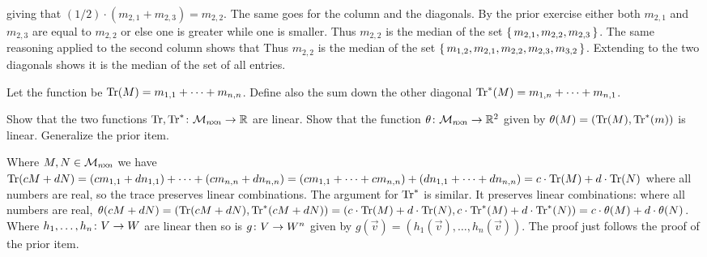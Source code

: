 \begin{exercises}
\begin{answer}
\begin{exparts}
          giving that $(1/2)\cdot(m_{2,1}+m_{2,3})=m_{2,2}$.
          The same goes for the column and the diagonals.
        \partsitem
          By the prior exercise either both $m_{2,1}$ and $m_{2,3}$ are equal
          to $m_{2,2}$ or else one is greater while one is smaller.
          Thus $m_{2,2}$ is the median of the set
          $\mbox{$\{\,m_{2,1},m_{2,2},m_{2,3}\,\}$}$.
          The same reasoning applied to the second column shows that 
          Thus $m_{2,2}$ is the median of the set
          $\mbox{$\{\,m_{1,2},m_{2,1},m_{2,2},m_{2,3},m_{3,2}\,\}$}$.
          Extending to the two diagonals shows it is the median of the set
          of all entries.
      \end{exparts}
    \end{answer}
  \item   \label{exer:TraceIsLinear}
    Let the  function be 
    $\operatorname{Tr} (M)=m_{1,1}+\cdots+m_{n,n}$.
    Define also
    the sum down the other diagonal
    $\operatorname{Tr}^* (M)=m_{1,n}+\cdots+m_{n,1}$.
    \begin{exparts}
      \partsitem 
        Show that the two functions 
        $\mbox{$\operatorname{Tr},\operatorname{Tr}^*\colon \mathcal{M}_{n \! \times \! n}\to \mathbb{R}$}$
        are linear.
      \partsitem
        Show that the function
       $\mbox{$\theta\colon \mathcal{M}_{n \! \times \! n}\to \mathbb{R}^2$}$
       given by $\theta(M)=(\operatorname{Tr}(M),\operatorname{Tr}^*(m))$
       is linear.
     \partsitem
       Generalize the prior item. 
    \end{exparts}
    \begin{answer}
      \begin{exparts}
        \partsitem
          Where $M,N\in\mathcal{M}_{n \! \times \! n}$ we have 
          $\operatorname{Tr}(cM+dN)=(cm_{1,1}+dn_{1,1})+\cdots+(cm_{n,n}+dn_{n,n})
          =(cm_{1,1}+\cdots+cm_{n,n})+(dn_{1,1}+\cdots+dn_{n,n})
          =c\cdot\operatorname{Tr}(M)+d\cdot\operatorname{Tr}(N)$ where
          all numbers are real, so the trace preserves linear
         combinations.
         The argument for $\operatorname{Tr}^*$ is similar.
       \partsitem
         It preserves linear combinations: where all numbers are real,
          $\theta(cM+dN)=(\operatorname{Tr}(cM+dN),\operatorname{Tr}^*(cM+dN))
          =(c\cdot\operatorname{Tr}(M)+d\cdot\operatorname{Tr}(N), c\cdot\operatorname{Tr}^*(M)+d\cdot\operatorname{Tr}^*(N))
          =c\cdot\theta(M)+d\cdot\theta(N)$.
       \partsitem   
         Where $\mbox{$h_1,\ldots,h_n\colon V\to W$}$ are linear then so is
         $\mbox{$g\colon V\to W^n$}$ given by
         $g(\vec{v})=(h_1(\vec{v}), \ldots, h_n(\vec{v}))$.
         The proof just follows the proof of the prior item.
      \end{exparts}
    \end{answer}

\end{exercises}

